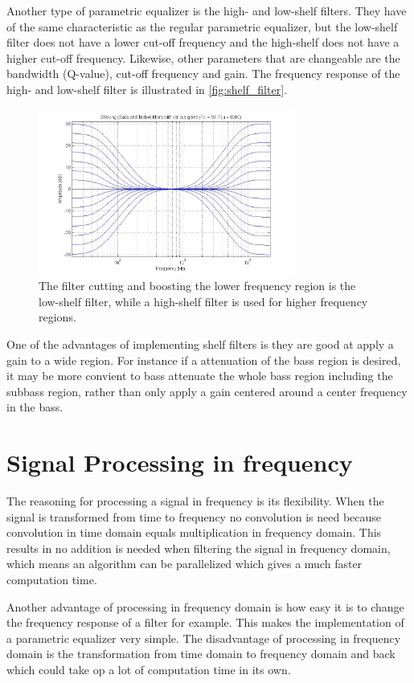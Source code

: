 Another type of parametric equalizer is the high- and low-shelf filters. They have of the same characteristic as the regular parametric equalizer, but the low-shelf filter does not have a lower cut-off frequency and the high-shelf does not have a higher cut-off frequency. Likewise, other parameters that are changeable are the bandwidth (Q-value), cut-off frequency and gain. The frequency response of the high- and low-shelf filter is illustrated in \autoref{fig:shelf_filter}.

\begin{figure}[H]
\centering
\includegraphics[width=0.75\textwidth]{figures/shelf_filter.jpg}
\caption{The filter cutting and boosting the lower frequency region is the low-shelf filter, while a high-shelf filter is used for higher frequency regions.}
\label{fig:shelf_filter}
\end{figure}

One of the advantages of implementing shelf filters is they are good at apply a gain to a wide region. For instance if a attenuation of the bass region is desired, it may be more convient to bass attenuate the whole bass region including the subbass region, rather than only apply a gain centered around a center frequency in the bass.

\section{Signal Processing in frequency}
The reasoning for processing a signal in frequency is its flexibility. When the signal is transformed from time to frequency no convolution is need because convolution in time domain equals multiplication in frequency domain. This results in no addition is needed when filtering the signal in frequency domain, which means an algorithm can be parallelized which gives a much faster computation time. 

Another advantage of processing in frequency domain is how easy it is to change the frequency response of a filter for example. This makes the implementation of a parametric equalizer very simple. The disadvantage of processing in frequency domain is the transformation from time domain to frequency domain and back which could take op a lot of computation time in its own. 

